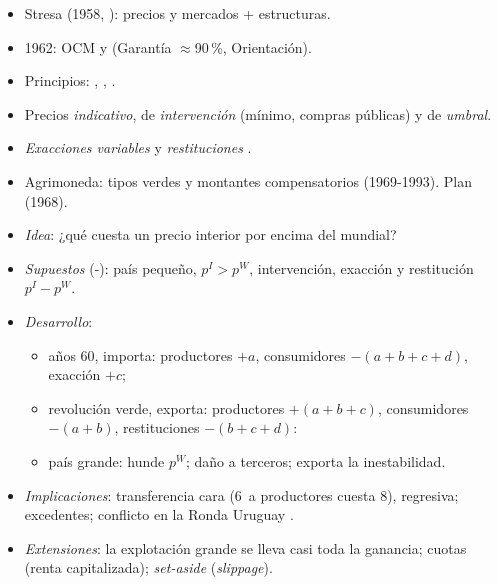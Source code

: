 \documentclass{article}
\begin{document}
\begin{columnas}
\begin{itemize}
\item Stresa (1958, ): precios y mercados + estructuras.
\item 1962: OCM y  (Garantía $\approx$90\,\%, Orientación).
\item Principios: , , .
\end{itemize}
\begin{itemize}
\item Precios \emph{indicativo}, de \emph{intervención} (mínimo, compras públicas) y de \emph{umbral}.
\item \emph{Exacciones variables} y \emph{restituciones} .
\item Agrimoneda: tipos verdes y montantes compensatorios (1969-1993). Plan  (1968).
\end{itemize}
\begin{itemize}
\item \emph{Idea}: ¿qué cuesta un precio interior por encima del mundial?
\item \emph{Supuestos} (-): país pequeño, $p^I>p^W$, intervención, exacción y restitución $p^I-p^W$.
\item \emph{Desarrollo}:
  \begin{itemize}
  \item años 60, importa: productores $+a$, consumidores $-(a+b+c+d)$, exacción $+c$;
  \item revolución verde, exporta: productores $+(a+b+c)$, consumidores $-(a+b)$, restituciones $-(b+c+d)$:
  \item país grande: hunde $p^W$; daño a terceros; exporta la inestabilidad.
  \end{itemize}
\end{itemize}
\begin{itemize}
\item \emph{Implicaciones}: transferencia cara (6~a productores cuesta 8), regresiva; excedentes; conflicto en la Ronda Uruguay .
\item \emph{Extensiones}: la explotación grande se lleva casi toda la ganancia; cuotas (renta capitalizada); \emph{set-aside} (\emph{slippage}).

\end{itemize}
\end{columnas}
\end{document}
